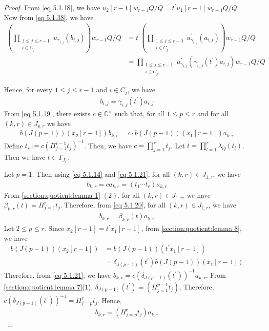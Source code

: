 \documentclass[12pt,reqno]{amsart}
\numberwithin{equation}{section}
\theoremstyle{definition}
\begin{document}
\begin{proof}
			From \cref{eq 5.1.18}, we have $u_{2}[r-1]w_{r-1}Q/Q=t^{\prime}u_{1}[r-1]w_{r-1}Q/Q$. Now from
			\cref{eq 5.1.38}, we have 
			\begin{align*}
				(\prod_{\substack{1\leq j\leq r-1\\i\in C_{j}}}u^{\prime}_{\gamma_{i,j}}(b_{i,j}))w_{r-1}Q/Q&=t^{\prime}(\prod_{\substack{1\leq j\leq r-1\\i\in C_{j}}}u^{\prime}_{\gamma_{i,j}}(a_{i,j}))w_{r-1}Q/Q\\&=\prod_{\substack{1\leq j\leq r-1\\i\in C_{j}}}u^{\prime}_{\gamma_{i,j}}(\gamma_{i,j}(t^{\prime})a_{i,j})w_{r-1}Q/Q
			\end{align*}
			
			
			
			Hence, for every $1\leq j\leq r-1$ and $i\in C_{j}$, we have 
			\begin{align}\label{eq 5.1.23}
				b_{i,j}=\gamma_{i,j}(t^{\prime})a_{i,j}
			\end{align}
			From \cref{eq 5.1.19}, there exists  $c\in\mathbb{C}^{\times}$ such that, for all $1\leq p\leq r$ and for all $(k,r)\in J_{p,r}$ we have \begin{align}\label{eq 5.1.21}
				b(J(p-1))(x_{2}[r-1])b_{k,r}=c\cdot b(J(p-1))(x_{1}[r-1])a_{k,r}
			\end{align}
			Define $t_{r}:=c(\Pi_{j=1}^{r-1}t_{j})^{-1}$. Then, we have $c=\prod_{j=1}^{r}t_{j}$. Let $t=\prod_{l=1}^{r}\lambda_{lq}(t_{l})$. Then we have $t\in T_{J_{r}}$.
			
			Let $p=1$. Then using \cref{eq 5.1.14} and \cref{eq 5.1.21}, for all $(k,r)\in J_{1,r}$, we have \begin{align}\label{eq 5.1.20}
				b_{k,r}=ca_{k,r}=
				(t_{1}\cdots t_{r})a_{k,r}
			\end{align} 
			From \cref{section:quotient:lemma 1} $(2)$, for all $(k,r)\in J_{1,r}$, we have $\beta_{k,r}(t)=\Pi_{j=1}^{r}t_{j}$. Therefore, from \cref{eq 5.1.20}, for all $(k,r)\in J_{1,r}$, we have \begin{align}\label{eq 5.1.42}
				b_{k,r}=\beta_{k,r}(t)a_{k,r}
			\end{align}
			Let $2\leq p\leq r$. Since $x_{2}[r-1]=t^{\prime}x_{1}[r-1]$, from \cref{section:quotient:lemma 8}, we have \begin{align*}
				b(J(p-1))(x_{2}[r-1])&=	b(J(p-1))(t^{\prime}x_{1}[r-1])\\
				&=\delta_{J(p-1)}(t^{\prime})b(J(p-1))(x_{1}[r-1])
			\end{align*} %
			Therefore, from \cref{eq 5.1.21}, we have  $b_{k,r}=c(\delta_{J(p-1)}(t^{\prime}))^{-1}a_{k,r}$. From \cref{section:quotient:lemma 7}(1), $\delta_{J(p-1)}(t^{\prime})=(\Pi_{j=1}^{p-1}t_{j})$. Therefore, $c(\delta_{J(p-1)}(t^{\prime}))^{-1}=\Pi_{j=p}^{r}t_{j}$. Hence,
			\begin{align}\label{eq 5.1.22}
				b_{k,r}=(\Pi_{j=p}^{r}t_{j})a_{k,r}
			\end{align}
			

\end{proof}
\end{document}
